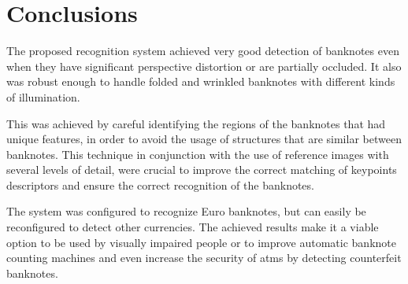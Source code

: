 \section{Conclusions}\label{sec:conclusions}

The proposed recognition system achieved very good detection of banknotes even when they have significant perspective distortion or are partially occluded. It also was robust enough to handle folded and wrinkled banknotes with different kinds of illumination.

This was achieved by careful identifying the regions of the banknotes that had unique features, in order to avoid the usage of structures that are similar between banknotes. This technique in conjunction with the use of reference images with several levels of detail, were crucial to improve the correct matching of keypoints descriptors and ensure the correct recognition of the banknotes.

The system was configured to recognize Euro banknotes, but can easily be reconfigured to detect other currencies. The achieved results make it a viable option to be used by visually impaired people or to improve automatic banknote counting machines and even increase the security of \glspl{atm} by detecting counterfeit banknotes.
